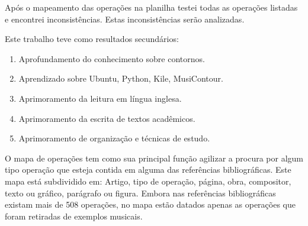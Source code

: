 \documentclass[11pt]{article}
\begin{document}
Após o mapeamento das operações na planilha testei todas as operações
listadas e encontrei inconsistências. Estas inconsistências serão analizadas.

Este trabalho teve como resultados secundários:

\begin{enumerate}
\item Aprofundamento do conhecimento sobre contornos.
\item Aprendizado sobre Ubuntu, Python, Kile, MusiContour.
\item Aprimoramento da leitura em língua inglesa.
\item Aprimoramento da escrita de textos acadêmicos.
\item Aprimoramento de organização e técnicas de estudo.
\end{enumerate}

\label{sec:discussao}

O mapa de operações tem como sua principal função agilizar a procura por
algum tipo operação que esteja contida em alguma das referências bibliográficas.
Este mapa está subdividido em: Artigo, tipo de operação, página, obra, compositor,
texto ou gráfico, parágrafo ou figura. Embora nas referências bibliográficas existam
mais de 508 operações, no mapa estão datados apenas as operações que foram retiradas
de exemplos musicais.


\end{document}

